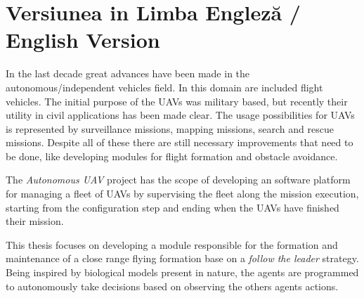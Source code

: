 
\section{Versiunea in Limba Engleză / English Version}

In the last decade great advances have been made in the autonomous/independent
vehicles field. In this domain are included flight vehicles. The initial 
purpose of the UAVs was military based, but recently their utility in civil applications
has been made clear. The usage possibilities for UAVs is represented by surveillance
missions, mapping missions, search and rescue missions. Despite all of these
there are still necessary improvements that need to be done, like developing
modules for flight formation and obstacle avoidance.

The \textit{Autonomous UAV} project has the scope of developing an 
software platform for managing a fleet of UAVs by supervising the fleet 
along the mission execution, starting from the configuration step and ending
when the UAVs have finished their mission.
% 

This thesis focuses on developing a module responsible for the formation and
maintenance of a close range flying formation base on a \textit{follow the leader}
strategy. Being inspired by biological models present in nature,  the agents are 
programmed to autonomously take decisions based on observing the others agents 
actions.